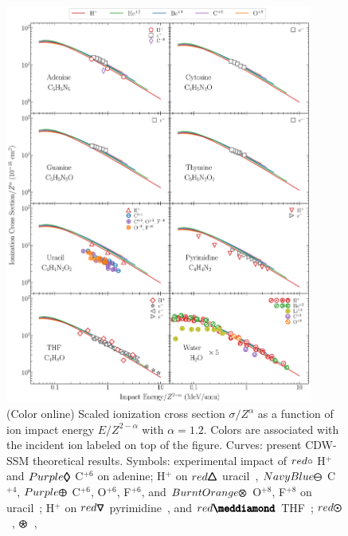 \documentclass[10pt,showpacs,showkeys,twocolumn]{revtex4-1}
\begin{document}
\begin{figure}[!htb]
\centering
\includegraphics[width=0.9\textwidth]{zscale_alpha.eps}
\caption{(Color online) Scaled ionization cross section $\sigma/Z^{\alpha}$ 
as a function of ion impact energy $E/Z^{2-\alpha}$ with $\alpha=1.2$. 
Colors are associated with the incident ion labeled on top of the figure. 
Curves: present CDW-SSM theoretical results. Symbols: experimental 
impact of \mbox{\LARGE$\color{red}\circ$} H$^+$~\cite{iriki2011} and
{\fontsize{11}{20}$\color{Purple}\pmb{\lozenge}$} C$^{+6}$ 
\cite{tribedi2019} on adenine;
H$^+$ on {\fontsize{11}{20}$\color{red}\pmb{\triangle}$} uracil~\cite{itoh2013}, 
{\fontsize{11}{20}$\color{NavyBlue}\pmb{\ominus}$} C$^{+4}$, 
{\fontsize{11}{20}$\color{Purple}\pmb{\oplus}$} C$^{+6}$, O$^{+6}$, F$^{+6}$, and 
{\fontsize{11}{20}$\color{BurntOrange}\pmb{\otimes}$} O$^{+8}$, 
F$^{+8}$ on uracil~\cite{agnihotri2012,agnihotri2013};
H$^+$ on {\fontsize{11}{20}$\color{red}\pmb{\triangledown}$} 
pyrimidine~\cite{wolff2014}, and 
{\fontsize{10}{20}$\color{red}\pmb{\meddiamond}$} THF~\cite{wang2016};
\mbox{\fontsize{11}{20}$\color{red}\pmb{\odot}$}~\cite{Luna2007}, 
{\fontsize{11}{20}\color{red}$\pmb{\logof}$}~\cite{Rudd86}, 
}
\end{figure}
\end{document}
